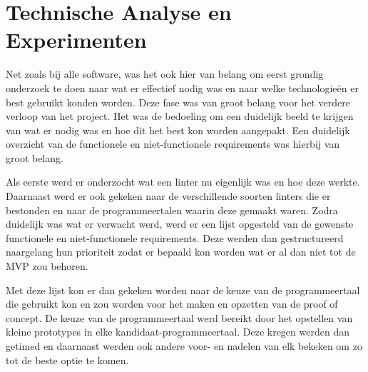 \chapter{Technische Analyse en Experimenten}
\label{ch:fase2}


Net zoals bij alle software, was het ook hier van belang om eerst grondig onderzoek te doen naar wat er effectief nodig was en naar welke technologieën er best gebruikt konden worden.
Deze fase was van groot belang voor het verdere verloop van het project. Het was de bedoeling om een duidelijk beeld te krijgen van wat er nodig was en hoe dit het best kon worden aangepakt. Een duidelijk overzicht van de functionele en niet-functionele requirements was hierbij van groot belang. 

Als eerste werd er onderzocht wat een linter nu eigenlijk was en hoe deze werkte. Daarnaast werd er ook gekeken naar de verschillende soorten linters die er bestonden en naar de programmeertalen waarin deze gemaakt waren. Zodra duidelijk was wat er verwacht werd, werd er een lijst opgesteld van de gewenste functionele en niet-functionele requirements. Deze werden dan gestructureerd naargelang hun prioriteit zodat er bepaald kon worden wat er al dan niet tot de MVP zou behoren.

Met deze lijst kon er dan gekeken worden naar de keuze van de programmeertaal die gebruikt kon en zou worden voor het maken en opzetten van de proof of concept. De keuze van de programmeertaal werd bereikt door het opstellen van kleine prototypes in elke kandidaat-programmeertaal. Deze kregen werden dan getimed en daarnaast werden ook andere voor- en nadelen van elk bekeken om zo tot de beste optie te komen.

